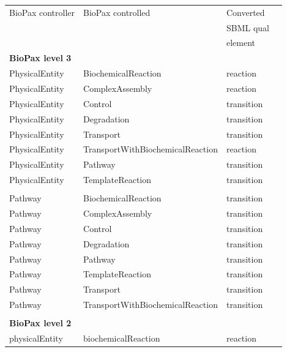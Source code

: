 \documentclass{bioinfo}
\begin{document}
\begin{methods}
\begin{table}[!t]
{\begin{tabular}{llll}\toprule
BioPax controller & BioPax controlled               & Converted\\
                  &                                 & SBML qual\\
                  &                                 & element\\
\midrule
\textbf{BioPax level 3}\\
\midrule
PhysicalEntity & BiochemicalReaction                & reaction\\
PhysicalEntity & ComplexAssembly                    & reaction\\
PhysicalEntity & Control                            & transition\\
PhysicalEntity & Degradation                        & transition\\
PhysicalEntity & Transport                          & transition\\
PhysicalEntity & TransportWithBiochemicalReaction   & reaction\\
PhysicalEntity & Pathway                            & transition\\
PhysicalEntity & TemplateReaction                   & transition\\
\\
Pathway         & BiochemicalReaction               & transition\\
Pathway         & ComplexAssembly                   & transition\\
Pathway         & Control                           & transition\\
Pathway         & Degradation                       & transition\\
Pathway         & Pathway                           & transition\\
Pathway         & TemplateReaction                  & transition\\
Pathway         & Transport                         & transition\\
Pathway         & TransportWithBiochemicalReaction  & transition\\
\\\midrule
\textbf{BioPax level 2}\\
\midrule
physicalEntity & biochemicalReaction                & reaction\\

\end{tabular}}
\end{table}
\end{methods}
\end{document}
